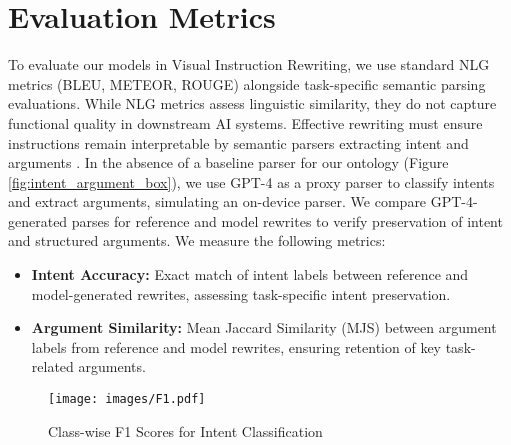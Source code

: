 \section{Evaluation Metrics}
To evaluate our models in Visual Instruction Rewriting, we use standard NLG metrics (BLEU, METEOR, ROUGE) \cite{sharma2017nlgeval} alongside task-specific semantic parsing evaluations. While NLG metrics assess linguistic similarity, they do not capture functional quality in downstream AI systems. Effective rewriting must ensure instructions remain interpretable by semantic parsers extracting intent and arguments \cite{louvan2020recent}. In the absence of a baseline parser for our ontology (Figure \ref{fig:intent_argument_box}), we use GPT-4 as a proxy parser to classify intents and extract arguments, simulating an on-device parser. We compare GPT-4-generated parses for reference and model rewrites to verify preservation of intent and structured arguments. We measure the following metrics:

\begin{itemize}
    \item \textbf{Intent Accuracy:} Exact match of intent labels between reference and model-generated rewrites, assessing task-specific intent preservation. 
    
    \item \textbf{Argument Similarity:} Mean Jaccard Similarity (MJS) between argument labels from reference and model rewrites, ensuring retention of key task-related arguments.
\end{itemize}

\begin{figure*}[t]
  \texttt{[image: images/F1.pdf]}
  \caption{Class-wise F1 Scores for Intent Classification}
  \label{fig:F1}
\end{figure*}